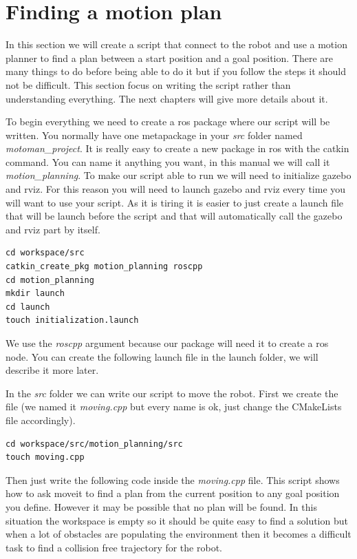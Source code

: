 \section{Finding a motion plan}

In this section we will create a script that connect to the robot and use a motion planner to find a plan between a start position and a goal position. There are many things to do before being able to do it but if you follow the steps it should not be difficult. This section focus on writing the script rather than understanding everything. The next chapters will give more details about it.

To begin everything we need to create a ros package where our script will be written. You normally have one metapackage in your \emph{src} folder named \emph{motoman\_project}. It is really easy to create a new package in ros with the catkin command. You can name it anything you want, in this manual we will call it \emph{motion\_planning}. To make our script able to run we will need to initialize gazebo and rviz. For this reason you will need to launch gazebo and rviz every time you will want to use your script. As it is tiring it is easier to just create a launch file that will be launch before the script and that will automatically call the gazebo and rviz part by itself.


\begin{lstlisting}
cd workspace/src
catkin_create_pkg motion_planning roscpp
cd motion_planning
mkdir launch
cd launch
touch initialization.launch
\end{lstlisting}

We use the \emph{roscpp} argument because our package will need it to create a ros node. You can create the following launch file in the launch folder, we will describe it more later. 




In the \emph{src} folder we can write our script to move the robot. First we create the file (we named it \emph{moving.cpp} but every name is ok, just change the CMakeLists file accordingly). 

\begin{lstlisting}
cd workspace/src/motion_planning/src
touch moving.cpp
\end{lstlisting}

Then just write the following code inside the \emph{moving.cpp} file. This script shows how to ask moveit to find a plan from the current position to any goal position you define. However it may be possible that no plan will be found. In this situation the workspace is empty so it should be quite easy to find a solution but when a lot of obstacles are populating the environment then it becomes a difficult task to find a collision free trajectory for the robot.

